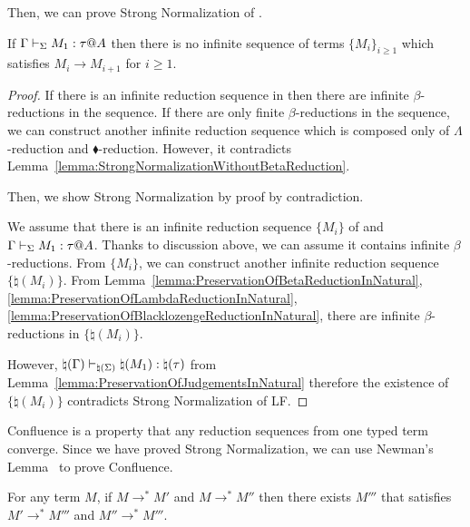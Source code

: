 Then, we can prove Strong Normalization of \LMD.

\begin{theorem}
    \label{theorem:StrongNormalization}
    If \( \G\V M_1:\tau@A \) then there is no infinite sequence of terms $\{M_i\}_{i\ge1}$ which satisfies $M_i \longrightarrow M_{i+1}$ for $i\ge 1$.
\end{theorem}

\begin{proof}

    If there is an infinite reduction sequence in \LMD then there are infinite \( \beta \)-reductions in the sequence. If there are only finite \( \beta \)-reductions in the sequence, we can construct another infinite reduction sequence which is composed only of \( \Lambda \)-reduction and \( \blacklozenge \)-reduction. However, it contradicts Lemma~\ref{lemma:StrongNormalizationWithoutBetaReduction}.
    
    Then, we show Strong Normalization by proof by contradiction. 
    
    We assume that there is an infinite reduction sequence \( \{ M_i \} \) of \LMD and \( \G\V M_1:\tau@A \). Thanks to discussion above, we can assume it contains infinite \( \beta \)-reductions. From \( \{ M_i \} \), we can construct another infinite reduction sequence \( \{ \natural(M_i) \} \). From Lemma~\ref{lemma:PreservationOfBetaReductionInNatural}, \ref{lemma:PreservationOfLambdaReductionInNatural}, \ref{lemma:PreservationOfBlacklozengeReductionInNatural}, there are infinite \( \beta \)-reductions in \( \{ \natural(M_i) \} \).
    
    However, \( \natural(\Gamma) \vdash_{\natural(\Sigma)} \natural(M_1):\natural(\tau) \) from Lemma~\ref{lemma:PreservationOfJudgementsInNatural} therefore the existence of \( \{ \natural(M_i) \} \) contradicts Strong Normalization of LF.
\end{proof}

Confluence is a property that any reduction sequences from one typed term
converge.  Since we have proved Strong Normalization, we can use Newman's
Lemma~\cite{BaaderTobias1998TermRewriting} to prove Confluence.

\begin{theorem}[Confluence]
    \label{theorem:confluence}
	For any term $M$, if $M \longrightarrow^* M'$ and $M \longrightarrow^* M''$ then
	there exists $M'''$ that satisfies $M' \longrightarrow^* M'''$ and $M'' \longrightarrow^* M'''$.
\end{theorem}

